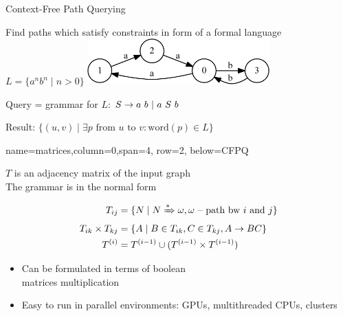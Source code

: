 \documentclass[a0paper,portrait]{baposter}
\begin{document}
\begin{poster}
\begin{posterbox}[name=CFPQ,column=0,row=0, span=4]{Context-Free Path Querying}

  Find paths which satisfy constraints in form of a formal language $L=\{a^n b^n \mid n > 0\}$
    \includegraphics[width=7cm]{example_graph_transparent.png}

    Query = grammar for $L$: $S  \rightarrow a  \ b \ | \ a \ S \ b  \\$

  Result: $ \{(u,v) \mid \exists p \text{ from } u \text{ to } v: \text{word}(p) \in L\} $

\end{posterbox}

{name=matrices,column=0,span=4, row=2, below=CFPQ}%
{

$T$ is an adjacency matrix of the input graph\\
The grammar is in the normal form
\vspace{-0.5cm}

\begin{align*}
T_{ij} &=\{ N \mid N \xRightarrow[]{*} \omega,  \omega \text{ -- path bw } i \text{ and } j \} \\
T_{ik} \times T_{kj} &= \{ A \mid B \in T_{ik}, C \in T_{kj}, A \rightarrow B C \} \\
T^{(i)} &= T^{(i-1)} \cup (T^{(i-1)} \times T^{(i-1)})
\end{align*}

\begin{itemize}
  \item Can be formulated in terms of boolean \\ matrices multiplication
  \item Easy to run in parallel environments: GPUs, multithreaded CPUs, clusters
\end{itemize}
\vspace{0.2cm}
}


\end{poster}
\end{document}
